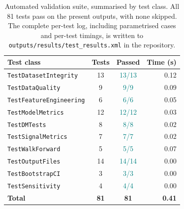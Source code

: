 \begin{table}[H]
\centering
\small
\caption{Automated validation suite, summarised by test class. All 81 tests pass on the present outputs, with none skipped. The complete per-test log, including parametrised cases and per-test timings, is written to \texttt{outputs/results/test\_results.xml} in the repository.}
\label{tab:test_report}
\begin{tabular}{lccr}
\toprule
Test class & Tests & Passed & Time (s) \\
\midrule
\texttt{TestDatasetIntegrity} & 13 & \textcolor{teal}{13/13} & 0.12 \\
\texttt{TestDataQuality} & 9 & \textcolor{teal}{9/9} & 0.09 \\
\texttt{TestFeatureEngineering} & 6 & \textcolor{teal}{6/6} & 0.05 \\
\texttt{TestModelMetrics} & 12 & \textcolor{teal}{12/12} & 0.03 \\
\texttt{TestDMTests} & 8 & \textcolor{teal}{8/8} & 0.02 \\
\texttt{TestSignalMetrics} & 7 & \textcolor{teal}{7/7} & 0.02 \\
\texttt{TestWalkForward} & 5 & \textcolor{teal}{5/5} & 0.07 \\
\texttt{TestOutputFiles} & 14 & \textcolor{teal}{14/14} & 0.00 \\
\texttt{TestBootstrapCI} & 3 & \textcolor{teal}{3/3} & 0.00 \\
\texttt{TestSensitivity} & 4 & \textcolor{teal}{4/4} & 0.00 \\
\midrule
\textbf{Total} & \textbf{81} & \textbf{81} & \textbf{0.41} \\
\bottomrule
\end{tabular}
\end{table}